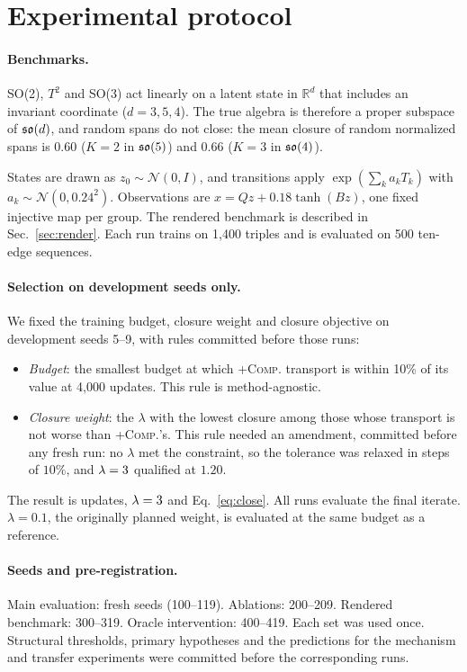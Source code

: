 \section{Experimental protocol}\label{sec:protocol}
\paragraph{Benchmarks.}
SO(2), $T^2$ and SO(3) act linearly on a latent state in $\mathbb R^d$ that includes an invariant coordinate
($d=3,5,4$). The true algebra is therefore a proper subspace of $\mathfrak{so}(d)$, and random spans do not close: the mean
closure of random normalized spans is $0.60$ ($K{=}2$ in $\mathfrak{so}(5)$) and $0.66$ ($K{=}3$ in $\mathfrak{so}(4)$).

States are drawn as $z_0\sim\mathcal N(0,I)$, and transitions apply $\exp(\sum_ka_kT_k)$ with
$a_k\sim\mathcal N(0,0.24^2)$. Observations are $x=Qz+0.18\tanh(Bz)$, one fixed injective map per group. The rendered
benchmark is described in Sec.~\ref{sec:render}. Each run trains on 1{,}400 triples and is evaluated on 500 ten-edge
sequences.

\paragraph{Selection on development seeds only.}
We fixed the training budget, closure weight and closure objective on development seeds 5--9, with rules committed
before those runs:
\begin{itemize}
\item \emph{Budget}: the smallest budget at which \textsc{+Comp.} transport is within 10\% of its value at 4{,}000
updates. This rule is method-agnostic.
\item \emph{Closure weight}: the $\lambda$ with the lowest closure among those whose transport is not worse than
\textsc{+Comp.}'s. This rule needed an amendment, committed before any fresh run: no $\lambda$ met the constraint, so
the tolerance was relaxed in steps of $10\%$, and $\lambda=3$ qualified at $1.20$.
\end{itemize}
The result is \NSteps{} updates, $\lambda=3$ and Eq.~\eqref{eq:close}. All runs evaluate the final iterate.
$\lambda=0.1$, the originally planned weight, is evaluated at the same budget as a reference.

\paragraph{Seeds and pre-registration.}
Main evaluation: \NNseeds{} fresh seeds (100--119). Ablations: 200--209. Rendered benchmark: 300--319. Oracle
intervention: 400--419. Each set was used once. Structural thresholds, primary hypotheses and the predictions for
the mechanism and transfer experiments were committed before the corresponding runs.

